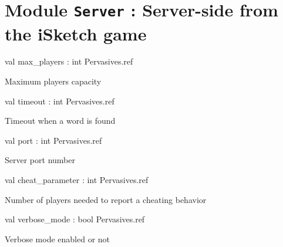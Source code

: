 \documentclass[11pt]{article}
\begin{document}
\tableofcontents
\section{Module {\tt{Server}} : Server-side from the iSketch game}
\label{module:Server}




\ocamldocvspace{0.5cm}



\label{val:Server.max-underscoreplayers}\begin{ocamldoccode}
val max_players : int Pervasives.ref
\end{ocamldoccode}
\begin{ocamldocdescription}
Maximum players capacity


\end{ocamldocdescription}




\label{val:Server.timeout}\begin{ocamldoccode}
val timeout : int Pervasives.ref
\end{ocamldoccode}
\begin{ocamldocdescription}
Timeout when a word is found


\end{ocamldocdescription}




\label{val:Server.port}\begin{ocamldoccode}
val port : int Pervasives.ref
\end{ocamldoccode}
\begin{ocamldocdescription}
Server port number


\end{ocamldocdescription}




\label{val:Server.cheat-underscoreparameter}\begin{ocamldoccode}
val cheat_parameter : int Pervasives.ref
\end{ocamldoccode}
\begin{ocamldocdescription}
Number of players needed to report a cheating behavior


\end{ocamldocdescription}




\label{val:Server.verbose-underscoremode}\begin{ocamldoccode}
val verbose_mode : bool Pervasives.ref
\end{ocamldoccode}
\begin{ocamldocdescription}
Verbose mode enabled or not


\end{ocamldocdescription}
\end{document}
